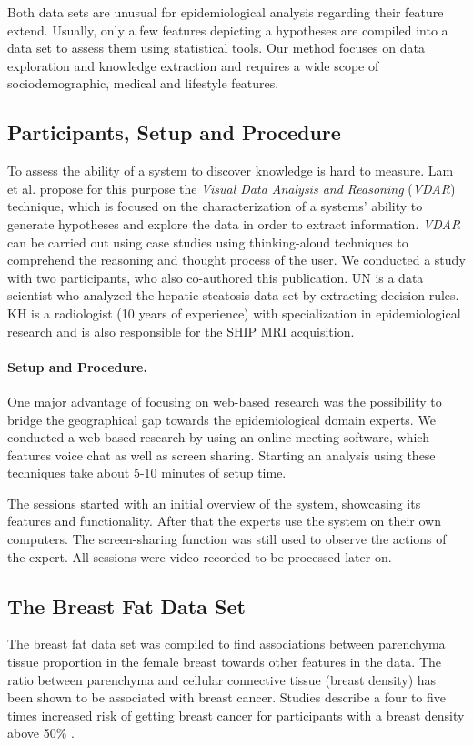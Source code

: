 \documentclass[journal]{style/vgtc} 			          %
\begin{document}
Both data sets are unusual for epidemiological analysis regarding their feature extend.
Usually, only a few features depicting a hypotheses are compiled into a data set to assess them using statistical tools.
Our method focuses on data exploration and knowledge extraction and requires a wide scope of sociodemographic, medical and lifestyle features.
\subsection{Participants, Setup and Procedure}
To assess the ability of a system to discover knowledge is hard to measure.
Lam et al. \cite{Lam2012} propose for this purpose the \emph{Visual Data Analysis and Reasoning} (\emph{VDAR}) technique, which is focused on the characterization of a systems' ability to generate hypotheses and explore the data in order to extract information.
\emph{VDAR} can be carried out using case studies using thinking-aloud techniques to comprehend the reasoning and thought process of the user.
We conducted a study with two participants, who also co-authored this publication.
UN is a data scientist who analyzed the hepatic steatosis data set by extracting decision rules.
KH is a radiologist (10 years of experience) with specialization in epidemiological research and is also responsible for the SHIP MRI acquisition.
\paragraph{Setup and Procedure.}
One major advantage of focusing on web-based research was the possibility to bridge the geographical gap towards the epidemiological domain experts.
We conducted a web-based research by using an online-meeting software, which features voice chat as well as screen sharing.
Starting an analysis using these techniques take about 5-10 minutes of setup time.

The sessions started with an initial overview of the system, showcasing its features and functionality.
After that the experts use the system on their own computers.
The screen-sharing function was still used to observe the actions of the expert.
All sessions were video recorded to be processed later on.
\subsection{The Breast Fat Data Set}
The breast fat data set was compiled to find associations between parenchyma tissue proportion in the female breast towards other features in the data.
The ratio between parenchyma and cellular connective tissue (breast density) has been shown to be associated with breast cancer.
Studies describe a four to five times increased risk of getting breast cancer for participants with a breast density above 50\% \cite{Mccormack2006}.
\end{document}
